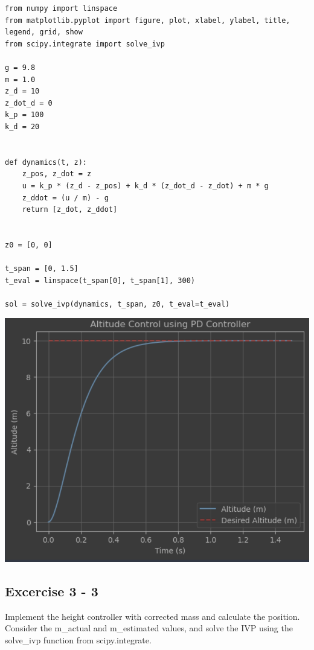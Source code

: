 \documentclass[letterpaper, 10 pt, conference]{ieeeconf}  %
\begin{document}
    \begin{lstlisting}[label={lst:lstlisting6}]
from numpy import linspace
from matplotlib.pyplot import figure, plot, xlabel, ylabel, title, legend, grid, show
from scipy.integrate import solve_ivp

g = 9.8
m = 1.0
z_d = 10
z_dot_d = 0
k_p = 100
k_d = 20


def dynamics(t, z):
    z_pos, z_dot = z
    u = k_p * (z_d - z_pos) + k_d * (z_dot_d - z_dot) + m * g
    z_ddot = (u / m) - g
    return [z_dot, z_ddot]


z0 = [0, 0]

t_span = [0, 1.5]
t_eval = linspace(t_span[0], t_span[1], 300)

sol = solve_ivp(dynamics, t_span, z0, t_eval=t_eval)
    \end{lstlisting}

    \begin{center}
        \includegraphics[scale=0.4]{2-3}
    \end{center}

    \subsection{Excercise 3 - 3}

    Implement the height controller with corrected mass and calculate the position.
    Consider the m\_actual and m\_estimated values, and solve the IVP using the solve\_ivp function from scipy.integrate.
\end{document}
